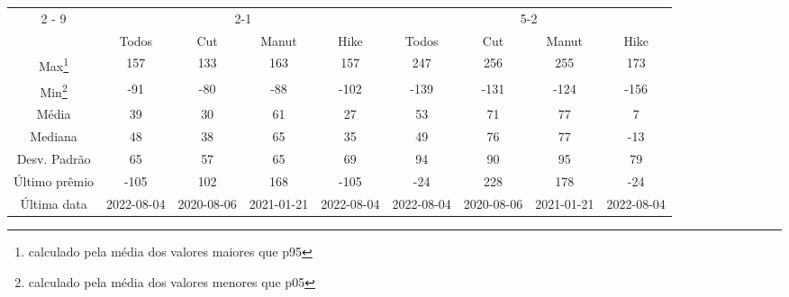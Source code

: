 \documentclass{article}%
\begin{document}
\begin{minipage}{\textwidth}%
\vspace*{0.4in}%
\centering%
\hspace*{-0.3in}%
%
%
\begin{tabular}{c c c c c c c c c }%
\cline{2%
-%
9}%
&\multicolumn{4}{|c|}{2{-}1}&\multicolumn{4}{c|}{5{-}2}\\%
&\multicolumn{1}{|c}{Todos}&\multicolumn{1}{c}{Cut}&\multicolumn{1}{c}{Manut}&\multicolumn{1}{c|}{Hike}&\multicolumn{1}{c}{Todos}&\multicolumn{1}{c}{Cut}&\multicolumn{1}{c}{Manut}&\multicolumn{1}{c|}{Hike}\\%
\hline%
\multicolumn{1}{|c|}{Max\footnote{calculado pela média dos valores maiores que p95}}&\multicolumn{1}{c}{157}&\multicolumn{1}{c}{133}&\multicolumn{1}{c}{163}&\multicolumn{1}{c|}{157}&\multicolumn{1}{c}{247}&\multicolumn{1}{c}{256}&\multicolumn{1}{c}{255}&\multicolumn{1}{c|}{173}\\%
\hline%
\multicolumn{1}{|c|}{Min\footnote{calculado pela média dos valores menores que p05}}&\multicolumn{1}{c}{{-}91}&\multicolumn{1}{c}{{-}80}&\multicolumn{1}{c}{{-}88}&\multicolumn{1}{c|}{{-}102}&\multicolumn{1}{c}{{-}139}&\multicolumn{1}{c}{{-}131}&\multicolumn{1}{c}{{-}124}&\multicolumn{1}{c|}{{-}156}\\%
\hline%
\multicolumn{1}{|c|}{Média}&\multicolumn{1}{c}{39}&\multicolumn{1}{c}{30}&\multicolumn{1}{c}{61}&\multicolumn{1}{c|}{27}&\multicolumn{1}{c}{53}&\multicolumn{1}{c}{71}&\multicolumn{1}{c}{77}&\multicolumn{1}{c|}{7}\\%
\hline%
\multicolumn{1}{|c|}{Mediana}&\multicolumn{1}{c}{48}&\multicolumn{1}{c}{38}&\multicolumn{1}{c}{65}&\multicolumn{1}{c|}{35}&\multicolumn{1}{c}{49}&\multicolumn{1}{c}{76}&\multicolumn{1}{c}{77}&\multicolumn{1}{c|}{{-}13}\\%
\hline%
\multicolumn{1}{|c|}{Desv. Padrão}&\multicolumn{1}{c}{65}&\multicolumn{1}{c}{57}&\multicolumn{1}{c}{65}&\multicolumn{1}{c|}{69}&\multicolumn{1}{c}{94}&\multicolumn{1}{c}{90}&\multicolumn{1}{c}{95}&\multicolumn{1}{c|}{79}\\%
\hline%
\multicolumn{1}{|c|}{Último prêmio}&\multicolumn{1}{c}{{-}105}&\multicolumn{1}{c}{102}&\multicolumn{1}{c}{168}&\multicolumn{1}{c|}{{-}105}&\multicolumn{1}{c}{{-}24}&\multicolumn{1}{c}{228}&\multicolumn{1}{c}{178}&\multicolumn{1}{c|}{{-}24}\\%
\hline%
\multicolumn{1}{|c|}{Última data}&\multicolumn{1}{c}{2022{-}08{-}04}&\multicolumn{1}{c}{2020{-}08{-}06}&\multicolumn{1}{c}{2021{-}01{-}21}&\multicolumn{1}{c|}{2022{-}08{-}04}&\multicolumn{1}{c}{2022{-}08{-}04}&\multicolumn{1}{c}{2020{-}08{-}06}&\multicolumn{1}{c}{2021{-}01{-}21}&\multicolumn{1}{c|}{2022{-}08{-}04}\\%
\hline%
\end{tabular}%



\end{minipage}
\end{document}

